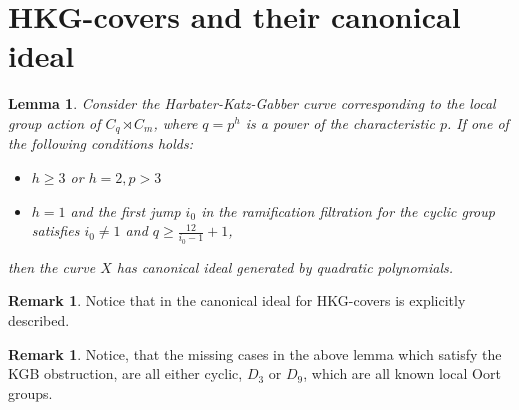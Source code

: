 \documentclass[11pt,letterpaper]{amsart}
\newtheorem{lemma}[theorem]{Lemma}
\theoremstyle{definition}
\newtheorem{remark}[theorem]{Remark}
\begin{document}
\section{HKG-covers and their canonical ideal}
%
%
%
\label{sec:HKG-covers}
\begin{lemma}
    \label{lemma:ineqHK}
Consider the Harbater-Katz-Gabber curve corresponding to the local group action of $C_q \rtimes C_m$, where $q=p^h$ is a power of the characteristic $p$. If one of the following conditions holds:
\begin{itemize}
\item $h\geq 3$ or $h=2, p>3$ 
\item $h=1$ and the first jump $i_0$ in the ramification filtration for the cyclic group satisfies
$i_0\neq 1$ and $q\geq \frac{12}{i_0-1}+1$,
\end{itemize}
then the curve $X$ has canonical ideal generated by quadratic polynomials.
\end{lemma}
\begin{remark}
  Notice that in \cite{MR4194180} the canonical ideal for HKG-covers is explicitly described.
\end{remark}
\begin{remark}
Notice, that the missing cases in the above lemma which  satisfy the KGB obstruction, are all either cyclic, $D_3$ or $D_9$,  which are all known local Oort groups. 
\end{remark}
\end{document}
